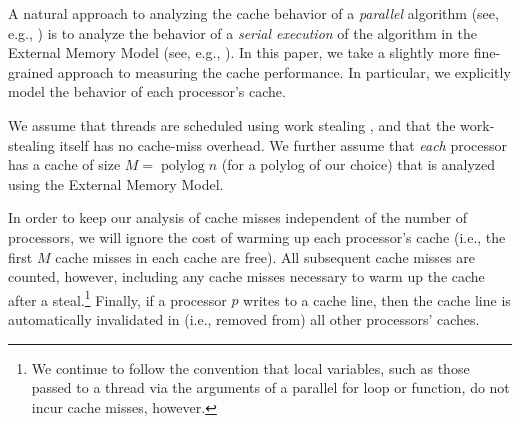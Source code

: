 \documentclass[11pt]{article}
\newcommand{\polylog}{\operatorname{polylog}}
\newcommand{\defn}[1]{{\textit{\textbf{\boldmath #1}}}}
\theoremstyle{remark}
\theoremstyle{remark}
\begin{document}
A natural approach to analyzing the cache behavior of a
\emph{parallel} algorithm (see, e.g., \cite{ParallelCacheAlg2}) is to
analyze the behavior of a \emph{serial execution} of the algorithm in
the External Memory Model (see, e.g., \cite{ParallelCacheAlg2}). In
this paper, we take a slightly more fine-grained approach to measuring
the cache performance. In particular, we explicitly model the
behavior of each processor's cache.

We assume that threads are scheduled using work stealing
\cite{AcarBl00, BlumofeLe99, FrigoLeRa98, AroraBlPl98, BlumofeJo96},
and that the work-stealing itself has no cache-miss overhead. We
further assume that \emph{each} processor has a cache of size
$M = \polylog n$ (for a polylog of our choice) that is analyzed using
the External Memory Model.

In order to keep our analysis of cache misses independent of the
number of processors, we will ignore the cost of warming up each
processor's cache (i.e., the first $M$ cache misses in each cache are
free).  All subsequent cache misses are counted, however, including
any cache misses necessary to warm up the cache after a
steal.\footnote{We continue to follow the convention that local
  variables, such as those passed to a thread via the arguments of a
  parallel for loop or function, do not incur cache misses, however.}
Finally, if a processor $p$ writes to a cache line, then the cache
line is automatically invalidated in (i.e., removed from) all other
processors' caches.


\end{document}
